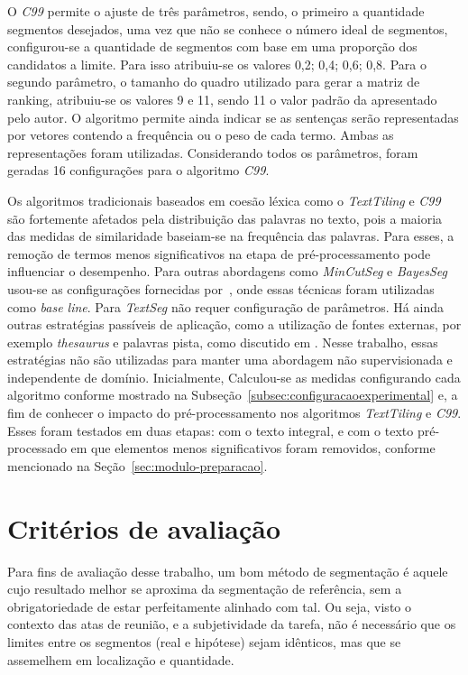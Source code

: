 O \textit{C99} permite o ajuste de três parâmetros, sendo, o primeiro a quantidade segmentos desejados, uma vez que não se conhece o número ideal de segmentos, configurou-se a quantidade de segmentos com base em uma proporção dos candidatos a limite. Para isso atribuiu-se os valores {0,2; 0,4; 0,6; 0,8}. Para o segundo parâmetro, o tamanho do quadro utilizado para gerar a matriz de ranking, atribuiu-se os valores 9 e 11, sendo 11 o valor padrão da apresentado pelo autor. O algoritmo permite ainda indicar se as sentenças serão representadas por vetores contendo a frequência ou o peso de cada termo. Ambas as representações foram utilizadas. Considerando todos os parâmetros, foram geradas 16 configurações para o algoritmo \textit{C99}.

Os algoritmos tradicionais baseados em coesão léxica como o \textit{TextTiling} e \textit{C99} são fortemente afetados pela distribuição das palavras no texto, pois a maioria das medidas de similaridade baseiam-se na frequência das palavras. Para esses, a remoção de termos menos significativos na etapa de pré-processamento pode influenciar o desempenho. Para outras abordagens como \textit{MinCutSeg} e \textit{BayesSeg} usou-se as configurações fornecidas por~\cite{Eis2008}, onde essas técnicas foram utilizadas como \textit{base line}. Para \textit{TextSeg} não requer configuração de parâmetros.
Há ainda outras estratégias passíveis de aplicação, como a utilização de fontes externas, por exemplo \textit{thesaurus} e palavras pista, como discutido em \cite{Naili2016, Gutierrez2016, Ferret2009}. Nesse trabalho, essas estratégias não são utilizadas para manter uma abordagem não supervisionada e independente de domínio. 
Inicialmente, Calculou-se as medidas configurando cada algoritmo conforme mostrado na Subseção~\ref{subsec:configuracaoexperimental} e, a fim de conhecer o impacto do pré-processamento nos algoritmos \textit{TextTiling} e \textit{C99}. Esses foram testados em duas etapas: com o texto integral, e com o texto pré-processado em que elementos menos significativos foram removidos, conforme mencionado na Seção~\ref{sec:modulo-preparacao}.  

\section{Critérios de avaliação}

Para fins de avaliação desse trabalho, um bom método de segmentação é aquele cujo resultado melhor se aproxima da segmentação de referência, sem a obrigatoriedade de estar perfeitamente alinhado com tal. Ou seja, visto o contexto das atas de reunião, e a subjetividade da tarefa, não é necessário que os limites entre os segmentos (real e hipótese) sejam idênticos, mas que se assemelhem em localização e quantidade.

